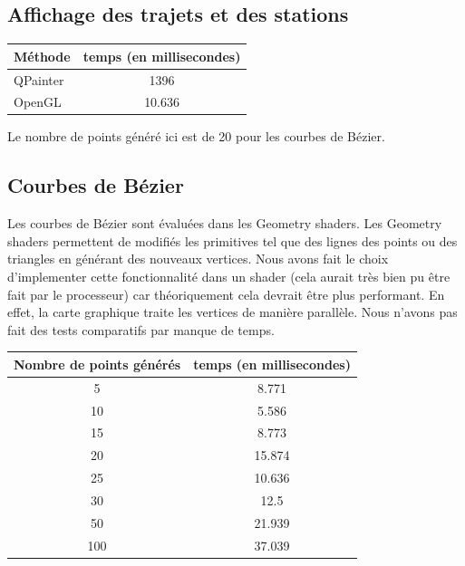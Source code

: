 \documentclass[12pt]{article}
\begin{document}
		\subsection{Affichage des trajets et des stations}
		\begin{center}
			\begin{tabular}{| l | c |}
			\hline
			\textbf{Méthode} & \textbf{temps (en millisecondes)} \\ \hline
			QPainter & 1396 \\ \hline
			OpenGL & 10.636 \\ \hline
		    \end{tabular}
	    \end{center}
	    
	    Le nombre de points généré ici est de 20 pour les courbes de Bézier.\\
	    	    
	    \subsection{Courbes de Bézier}
		Les courbes de Bézier sont évaluées dans les Geometry shaders. Les Geometry shaders
		permettent de modifiés les primitives tel que des lignes des points ou des triangles
		en générant des nouveaux vertices. Nous avons fait le choix d'implementer cette 
		fonctionnalité dans un shader (cela aurait très bien pu être fait par le processeur)
		car théoriquement cela devrait être plus performant. En effet, la carte graphique
		traite les vertices de manière parallèle. Nous n'avons pas fait des tests
		comparatifs par manque de temps.\\
	    
		\begin{center}
			\begin{tabular}{| c | c |}
			\hline
			\textbf{Nombre de points générés} & \textbf{temps (en millisecondes)}\\ \hline
			5  &  8.771 \\ \hline
			10 &  5.586 \\ \hline
			15 &  8.773 \\ \hline
			20 &  15.874 \\ \hline
			25 &  10.636 \\ \hline
			30 &  12.5 \\ \hline
			50 &  21.939\\ \hline
			100 &  37.039 \\ \hline
		    \end{tabular}
	    \end{center}
	    
\end{document}
